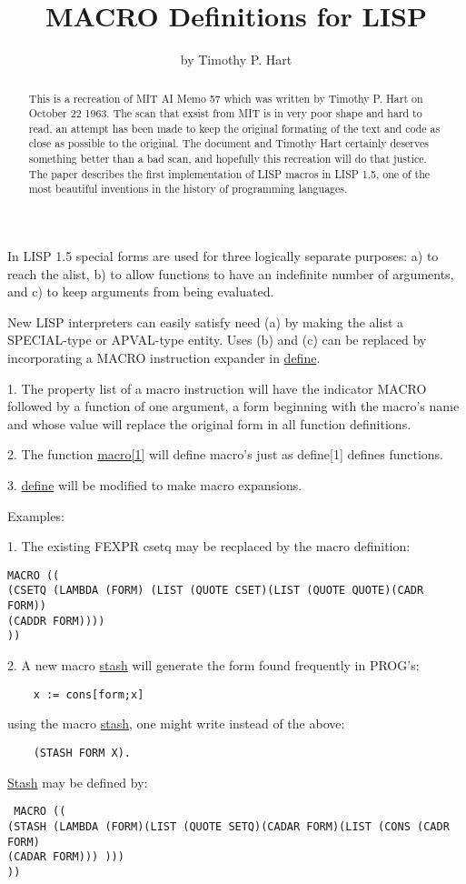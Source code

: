 \documentclass{article}
\title{MACRO Definitions for LISP}
\author{by Timothy P. Hart}
\date{}
\begin{document}
\maketitle

\begin{abstract}
    This is a recreation of MIT AI Memo 57 which was written by Timothy P. Hart on October 22 1963. The scan that exsist from MIT is in very poor shape and hard to read, an attempt has been made to keep the original formating of the text and code as close as possible to the original. The document and Timothy Hart certainly deserves something better than a bad scan, and hopefully this recreation will do that justice. The paper describes the first implementation of LISP macros in LISP 1.5, one of the most beautiful inventions in the history of programming languages.
\end{abstract}
\vspace{2em}
\onehalfspacing
In LISP 1.5 special forms are used for three logically separate purposes: a) to reach the alist, b) to allow functions to have an indefinite number of arguments, and c) to keep arguments from being evaluated.

New LISP interpreters can easily satisfy need (a) by making the alist a SPECIAL-type or APVAL-type entity. Uses (b) and (c) can be replaced by incorporating a MACRO instruction expander in \underline{define}.

1. The property list of a macro instruction will have the indicator MACRO followed by a function of one argument, a form beginning with the macro's name and whose value will replace the original form in all function definitions.

2. The function \underline{macro[1]} will define macro's just as define[1] defines functions.

3. \underline{define} will be modified to make macro expansions.

Examples:

1. The existing FEXPR csetq may be recplaced by the macro definition:
\begin{verbatim}
MACRO ((
(CSETQ (LAMBDA (FORM) (LIST (QUOTE CSET)(LIST (QUOTE QUOTE)(CADR FORM))
(CADDR FORM))))
))
\end{verbatim}

2. A new macro \underline{stash} will generate the form found frequently in PROG's:
\begin{verbatim}
    x := cons[form;x]
\end{verbatim}
using the macro \underline{stash}, one might write instead of the above:
\begin{verbatim}
    (STASH FORM X).
\end{verbatim}
\underline{Stash} may be defined by:
\begin{verbatim}
 MACRO ((
(STASH (LAMBDA (FORM)(LIST (QUOTE SETQ)(CADAR FORM)(LIST (CONS (CADR FORM)
(CADAR FORM))) )))
))
\end{verbatim}
\end{document}
